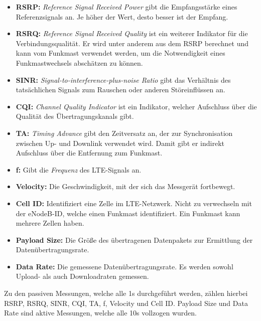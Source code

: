 \begin{itemize}
    \item \textbf{RSRP:} \textit{Reference Signal Received Power} gibt die Empfangsst\"arke eines Referenzsignals an. Je h\"oher der Wert,
        desto besser ist der Empfang.
    \item \textbf{RSRQ:} \textit{Reference Signal Received Quality} ist ein weiterer Indikator f\"ur die Verbindungsqualit\"at.
        Er wird unter anderem aus dem RSRP berechnet und kann vom Funkmast verwendet werden, 
        um die Notwendigkeit eines Funkmastwechsels absch\"atzen zu k\"onnen.
    \item \textbf{SINR:} \textit{Signal-to-interference-plus-noise Ratio} gibt das Verh\"altnis des tats\"achlichen Signals zum Rauschen
        oder anderen St\"oreinfl\"ussen an.
    \item \textbf{CQI:} \textit{Channel Quality Indicator} ist ein Indikator, welcher Aufschluss \"uber die
        Qualit\"at des \"Ubertragungskanals gibt.
    \item \textbf{TA:} \textit{Timing Advance} gibt den Zeitversatz an, der zur Synchronisation zwischen Up- und Downlink
        verwendet wird. Damit gibt er indirekt Aufschluss \"uber die Entfernung zum Funkmast.
    \item \textbf{f:} Gibt die \textit{Frequenz} des LTE-Signals an.
    \item \textbf{Velocity:} Die Geschwindigkeit, mit der sich das Messger\"at fortbewegt.
    \item \textbf{Cell ID:} Identifiziert eine Zelle im LTE-Netzwerk. Nicht zu verwechseln mit der eNodeB-ID, welche einen Funkmast
        identifiziert. Ein Funkmast kann mehrere Zellen haben.
    \item \textbf{Payload Size:} Die Gr\"o{\ss}e des \"ubertragenen Datenpakets zur Ermittlung der Daten\"ubertragungsrate.
    \item \textbf{Data Rate:} Die gemessene Daten\"ubertragungsrate. Es werden sowohl Upload- als auch Downloadraten gemessen.
\end{itemize}
Zu den passiven Messungen, welche alle 1s durchgef\"uhrt werden, z\"ahlen hierbei RSRP, RSRQ, SINR, CQI, TA, f, Velocity und
Cell ID. Payload Size und Data Rate sind aktive Messungen, welche alle 10s vollzogen wurden.

